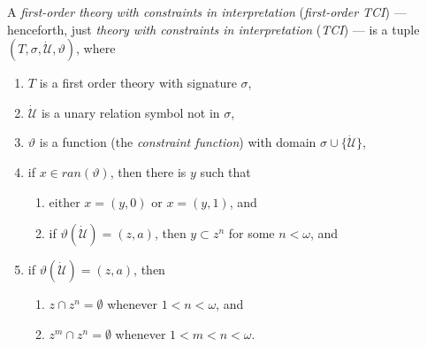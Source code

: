 \documentclass[12pt]{article}
\numberwithin{equation}{section}
\begin{document}
\begin{defi}
A \emph{first-order theory with constraints in interpretation} (\emph{first-order TCI}) --- henceforth, just \emph{theory with constraints in interpretation} (\emph{TCI}) --- is a tuple $(T, \sigma, \dot{\mathcal{U}}, \vartheta)$, where
\begin{enumerate}[label=(\alph*)]
    \item $T$ is a first order theory with signature $\sigma$,
    \item $\dot{\mathcal{U}}$ is a unary relation symbol not in $\sigma$,
    \item $\vartheta$ is a function (the \emph{constraint function}) with domain $\sigma \cup \{\dot{\mathcal{U}}\}$, 
    \item if $x \in ran(\vartheta)$, then there is $y$ such that 
    \begin{enumerate}[label=(\roman*)]
        \item either $x = (y, 0)$ or $x = (y, 1)$, and
        \item if $\vartheta(\dot{\mathcal{U}}) = (z, a)$, then $y \subset z^n$ for some $n < \omega$, and
    \end{enumerate}
    \item if $\vartheta(\dot{\mathcal{U}}) = (z, a)$, then 
    \begin{enumerate}[label=(\roman*)]
        \item $z \cap z^n = \emptyset$ whenever $1 < n < \omega$, and
        \item $z^m \cap z^n = \emptyset$ whenever $1 < m < n < \omega$.
    \end{enumerate}
\end{enumerate}
\end{defi}
\end{document}
